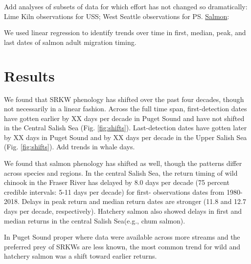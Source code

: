 \documentclass{article}
\begin{document}
\par Add analyses of subsets of data for which effort has not changed so dramatically: Lime Kiln observations for USS; West Seattle observations for PS.
\underline{Salmon}:
\par We used linear regression to identify trends over time in first, median, peak, and last dates of salmon adult migration timing. 

\section*{Results}
\par We found that SRKW phenology has shifted over the past four decades, though not necessarily in a linear fashion. Across the full time span, first-detection dates have gotten earlier by XX days per decade in Puget Sound and have not shifted in the Central Salish Sea (Fig. \ref{fig:shifts}). 
Last-detection dates have gotten later by XX days in Puget Sound and by XX days per decade in the Upper Salish Sea (Fig. \ref{fig:shifts}). Add trends in whale days. %
\par We found that salmon phenology has shifted as well, though the patterns differ across species and regions. In the central Salish Sea, the return timing of wild chinook in the Fraser River has delayed by 8.0 days per decade (75 percent credible intervals: 5-11 days per decade) for first- observations dates from 1980-2018.  Delays in peak return and median return dates are stronger (11.8 and 12.7 days per decade, respectively). Hatchery salmon also showed delays in first and median returns in the central Salish Sea(e.g., chum salmon).
\par In Puget Sound proper where data were available across more streams and the preferred prey of SRKWs are less known, the most common trend for wild and hatchery salmon was a shift toward earlier returns.
\end{document}
